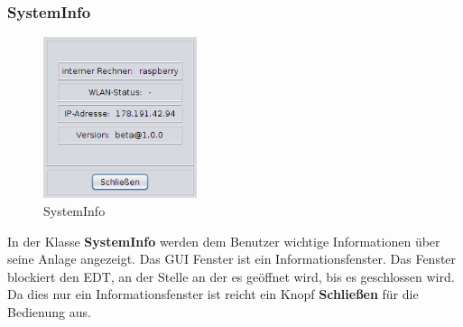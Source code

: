 \newpage

\subsubsection{SystemInfo}
\begin{figure}
\vspace{-20pt}
  \begin{center}
    \includegraphics[width=0.40\textwidth]{Bilder/GUI/SystemInfo}
  \end{center}
  \caption{SystemInfo}
  \label{SystemInfo}
  \vspace{-70pt}
\end{figure}
   
In der Klasse \textbf{SystemInfo} werden dem Benutzer wichtige Informationen über seine Anlage angezeigt. Das GUI Fenster ist ein Informationsfenster. Das Fenster blockiert den EDT, an der Stelle an der es geöffnet wird, bis es geschlossen wird. Da dies nur ein Informationsfenster ist reicht ein Knopf \textbf{Schließen} für die Bedienung aus.

\vspace{10pt}

